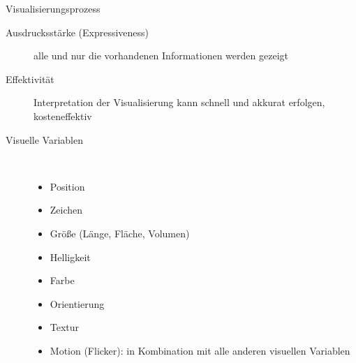 \begin{TOP}{Visualisierungsprozess}
	\vspace*{-2\baselineskip}
	\begin{description}
		\item[Ausdrucksstärke (Expressiveness)] alle und nur die vorhandenen Informationen werden gezeigt
		\item[Effektivität] Interpretation der Visualisierung kann schnell und akkurat erfolgen, kosteneffektiv
		\item[Visuelle Variablen]\ \\\vspace*{-\baselineskip}
			\begin{itemize}
				\item Position
				\item Zeichen
				\item Größe (Länge, Fläche, Volumen)
				\item Helligkeit
				\item Farbe
				\item Orientierung
				\item Textur
				\item Motion (Flicker): in Kombination mit alle anderen visuellen Variablen
			\end{itemize}
	\end{description}
	\ \\
\end{TOP}

